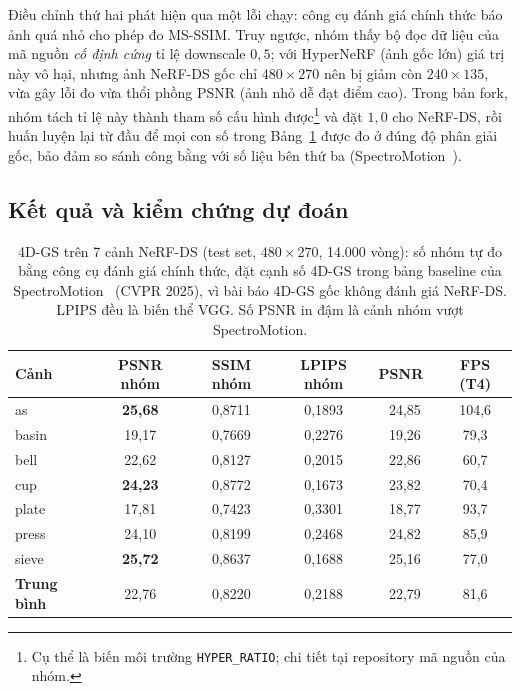 \documentclass[a4paper]{report}
\begin{document}
Điều chỉnh thứ hai phát hiện qua một lỗi chạy: công cụ đánh giá chính thức báo ảnh
quá nhỏ cho phép đo MS-SSIM. Truy ngược, nhóm thấy bộ đọc dữ liệu của mã nguồn
\textit{cố định cứng} tỉ lệ downscale $0{,}5$; với HyperNeRF (ảnh gốc lớn) giá trị
này vô hại, nhưng ảnh NeRF-DS gốc chỉ $480\times270$ nên bị giảm còn $240\times135$,
vừa gây lỗi đo vừa thổi phồng PSNR (ảnh nhỏ dễ đạt điểm cao). Trong bản fork, nhóm tách tỉ lệ này thành
tham số cấu hình được\footnote{Cụ thể là biến môi trường \texttt{HYPER\_RATIO}; chi
tiết tại repository mã nguồn của nhóm.} và đặt $1{,}0$ cho NeRF-DS, rồi
huấn luyện lại từ đầu để mọi con số trong Bảng~\ref{tab:nerfds} được đo ở đúng độ
phân giải gốc, bảo đảm so sánh công bằng với số liệu bên thứ ba
(SpectroMotion~\cite{spectromotion}).

\subsection*{Kết quả và kiểm chứng dự đoán}

\begin{table}[H]
\centering
\small
\caption[Kết quả 4D-GS trên NeRF-DS]{4D-GS trên 7 cảnh NeRF-DS (test set, $480\times270$, 14.000 vòng): số nhóm
tự đo bằng công cụ đánh giá chính thức, đặt cạnh số 4D-GS trong bảng baseline của
SpectroMotion~\cite{spectromotion} (CVPR 2025), vì bài báo 4D-GS gốc không đánh
giá NeRF-DS. LPIPS đều là biến thể VGG. Số PSNR in đậm là cảnh nhóm vượt SpectroMotion.}
\label{tab:nerfds}
\setlength{\tabcolsep}{5pt}
\begin{tabular}{l|ccc|c|c}
\hline
\textbf{Cảnh} & \textbf{PSNR nhóm} & \textbf{SSIM nhóm} & \textbf{LPIPS nhóm}
 & \textbf{PSNR~\cite{spectromotion}} & \textbf{FPS (T4)} \\
\hline
as    & \textbf{25,68} & 0,8711 & 0,1893 & 24,85 & 104,6 \\
basin & 19,17 & 0,7669 & 0,2276 & 19,26 & 79,3 \\
bell  & 22,62 & 0,8127 & 0,2015 & 22,86 & 60,7 \\
cup   & \textbf{24,23} & 0,8772 & 0,1673 & 23,82 & 70,4 \\
plate & 17,81 & 0,7423 & 0,3301 & 18,77 & 93,7 \\
press & 24,10 & 0,8199 & 0,2468 & 24,82 & 85,9 \\
sieve & \textbf{25,72} & 0,8637 & 0,1688 & 25,16 & 77,0 \\
\hline
\textbf{Trung bình} & 22,76 & 0,8220 & 0,2188 & 22,79 & 81,6 \\
\hline
\end{tabular}
\end{table}
\end{document}
